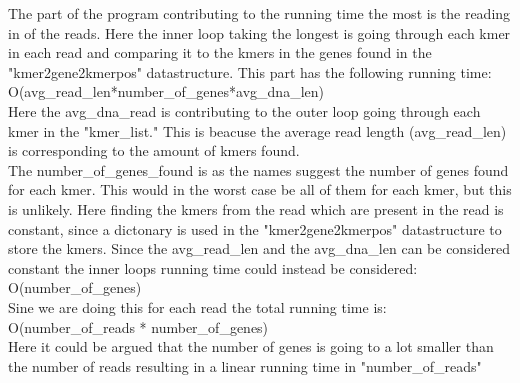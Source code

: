 
The part of the program contributing to the running time the most
is the reading in of the reads. Here the inner loop taking the longest
is going through each kmer in each read and comparing it to the
kmers in the genes found in the "kmer2gene2kmerpos" datastructure.
This part has the following running time: \\

O(avg_read_len*number_of_genes*avg_dna_len) \\

Here the avg_dna_read is contributing to the outer loop 
going through each kmer in the "kmer_list." This is beacuse
the average read length (avg_read_len) is corresponding to the amount
of kmers found. \\
The number_of_genes_found is as the names suggest the number of genes found for each kmer.
This would in the worst case be all of them for each kmer, but this is unlikely. 
Here finding the kmers from the read which are present in the read is constant, since a dictonary 
is used in the "kmer2gene2kmerpos" datastructure to store the kmers.
Since the avg_read_len and the avg_dna_len can be considered
constant the inner loops running time could instead be considered: \\

O(number_of_genes) \\

Sine we are doing this for each read the total running time is: \\

O(number_of_reads * number_of_genes) \\

Here it could be argued that the number of genes is going to a lot smaller 
than the number of reads resulting in a linear running time in "number_of_reads"


